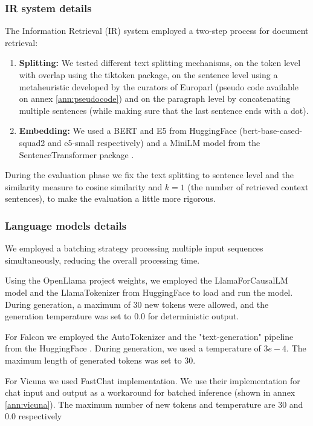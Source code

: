 \documentclass[a4paper,12pt]{article}
\begin{document}
\subsubsection*{IR system details}
The Information Retrieval (IR) system employed a two-step process for document retrieval:

\begin{enumerate}
	\item \textbf{Splitting:} We tested different text splitting mechanisms, on the token level with overlap using the tiktoken package, 
    on the sentence level using a metaheuristic developed by the curators of Europarl \cite{europarl} (pseudo code available on annex \ref{ann:pseudocode}) and on the paragraph level by concatenating multiple sentences (while making sure that the last sentence ends with a dot).
	
    \item \textbf{Embedding:} We used a BERT \cite{bert} and E5 \cite{e5} from HuggingFace \cite{huggingface} (bert-base-cased-squad2 and e5-small respectively) and a MiniLM \cite{minilm} model from the SentenceTransformer package \cite{sbert}.
\end{enumerate}

During the evaluation phase we fix the text splitting to sentence level and the similarity measure to cosine similarity and $k=1$ (the number of retrieved context sentences), to make the evaluation a little more rigorous.  

\subsubsection*{Language models details}
We employed a batching strategy processing multiple input sequences simultaneously, reducing the overall processing time.

Using the OpenLlama project \cite{openllama} weights, we employed the LlamaForCausalLM model and the LlamaTokenizer from HuggingFace \cite{huggingface} to load and run the model. 
During generation, a maximum of 30 new tokens were allowed, and the generation temperature was set to 0.0 for deterministic output. 

For Falcon \cite{falcon} we employed the AutoTokenizer and the "text-generation" pipeline from the HuggingFace \cite{huggingface}. 
During generation, we used a temperature of $3e-4$. The maximum length of generated tokens was set to 30.

For Vicuna \cite{vicuna} we used FastChat \cite{fastchat} implementation.
We use their implementation for chat input and output as a workaround for batched inference (shown in annex \ref*{ann:vicuna}). 
The maximum number of new tokens and temperature are 30 and 0.0 respectively 
\end{document}
